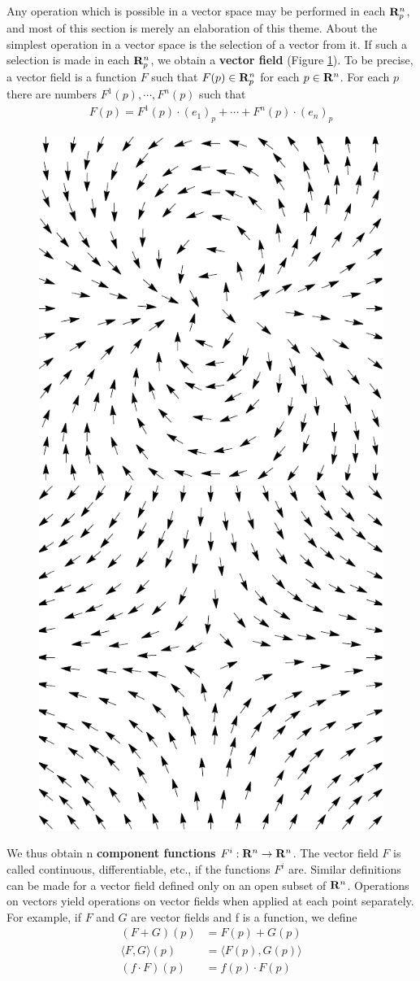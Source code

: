 Any operation which is possible in a vector space may be
performed in each $\mathbf{R}^n_p$, and most of this section is merely an
elaboration of this theme. About the simplest operation in a vector space is the 
selection of a vector from it. If such a selection is made in each $\mathbf{R}^n_p$, we 
obtain a \textbf{vector field} (Figure \ref{Fig 4-2}). To be precise, a vector field is a 
function $F$ such that $F(p)\in \mathbf{R}^n_p$ for each $p\in\mathbf{R}^n$. For each 
$p$ there are numbers $F^1(p), \cdots,F^n(p)$ such that
\begin{align*}
    F(p) = F^1(p)\cdot (e_1)_p + \cdots + F^n(p)\cdot (e_n)_p
\end{align*}

\begin{figure}[!htb]
    \centering
    \includegraphics[width=.4\linewidth, angle=90]{./pics/Fig4-2-(1).pdf}
    \includegraphics[width=.4\linewidth, angle=90]{./pics/Fig4-2-(2).pdf}
    \caption{}
    \label{Fig 4-2}
\end{figure}

We thus obtain n \textbf{component functions} $F^i:\mathbf{R}^n\to \mathbf{R}^n$.
The vector field $F$ is called continuous, differentiable, etc., if the
functions $F^i$ are. Similar definitions can be made for a vector
field defined only on an open subset of $\mathbf{R}^n$. Operations on
vectors yield operations on vector fields when applied at each
point separately. For example, if $F$ and $G$ are vector fields
and f is a function, we define
\begin{align*}
    (F+G)(p) & = F(p) + G(p) \\
    \langle F, G\rangle(p) & = \langle F(p), G(p)\rangle \\
    (f\cdot F)(p) & = f(p)\cdot F(p)
\end{align*}

